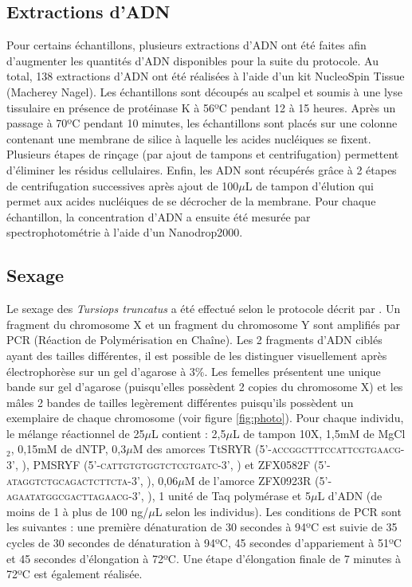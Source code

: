 \documentclass[a4paper,12pt,twoside]{article}\usepackage[]{graphicx}\usepackage[]{color}
\begin{document}
\begin {bibunit} [newbst]
\subsection{Extractions d'ADN}
Pour certains échantillons, plusieurs extractions d'ADN ont été faites afin d'augmenter les quantités d'ADN disponibles pour la suite du protocole. Au total, 138 extractions d'ADN ont été réalisées à l'aide d'un kit NucleoSpin\textregistered{} Tissue (Macherey Nagel). Les échantillons sont découpés au scalpel et soumis à une lyse tissulaire en présence de protéinase K à 56ºC pendant 12 à 15 heures. Après un passage à 70ºC pendant 10 minutes, les échantillons sont placés sur une colonne contenant une membrane de silice à laquelle les acides nucléiques se fixent. Plusieurs étapes de rinçage (par ajout de tampons et centrifugation) permettent d'éliminer les résidus cellulaires. Enfin, les ADN sont récupérés grâce à 2 étapes de centrifugation successives après ajout de 100$\mu$L de tampon d'élution qui permet aux acides nucléiques de se décrocher de la membrane. Pour chaque échantillon, la concentration d'ADN a ensuite été mesurée par spectrophotométrie à l'aide d'un Nanodrop2000.

\subsection{Sexage}
Le sexage des \emph{Tursiops truncatus} a été effectué selon le protocole décrit par \citet{rosel2003pcr}. Un fragment du chromosome X et un fragment du chromosome Y sont amplifiés par PCR (Réaction de Polymérisation en Chaîne). Les 2 fragments d'ADN ciblés ayant des tailles différentes, il est possible de les distinguer visuellement après électrophorèse sur un gel d'agarose à 3\%. Les femelles présentent une unique bande sur gel d'agarose (puisqu'elles possèdent 2 copies du chromosome X) et les mâles 2 bandes de tailles legèrement différentes puisqu'ils possèdent un exemplaire de chaque chromosome (voir figure \ref{fig:photo}).
Pour chaque individu, le mélange réactionnel de 25$\mu$L contient : 2,5$\mu$L de tampon 10X, 1,5mM de MgCl$_2$, 0,15mM de dNTP, 0,3$\mu$M des amorces TtSRYR (5'-\textsc{accggctttccattcgtgaacg}-3', \citealt{rosel2003pcr}), PMSRYF (5'-\textsc{cattgtgtggtctcgtgatc}-3', \citealt{richard1994dna}) et ZFX0582F (5'-\textsc{ataggtctgcagactcttcta}-3', \citealt{berube1996identification}), 0,06$\mu$M de l'amorce ZFX0923R (5'-\textsc{agaatatggcgacttagaacg}-3', \citealt{berube1996identification}), 1 unité de Taq polymérase et 5$\mu$L d'ADN (de moins de 1 à plus de 100 ng/$\mu$L selon les individus). Les conditions de PCR sont les suivantes : une première dénaturation de 30 secondes à 94ºC est suivie de 35 cycles de 30 secondes de dénaturation à 94ºC, 45 secondes d'appariement à 51ºC et 45 secondes d'élongation à 72ºC. Une étape d'élongation finale de 7 minutes à 72ºC est également réalisée.


\end{bibunit}
\end{document}
